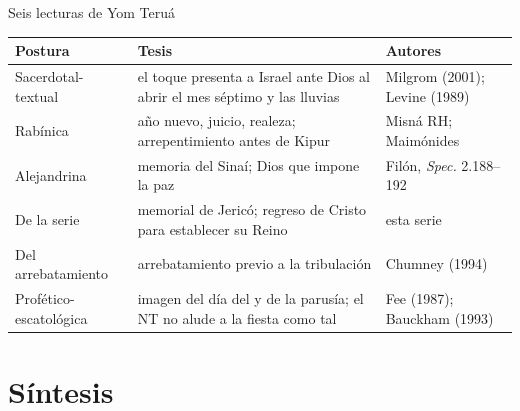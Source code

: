 \begin{frame}{Seis lecturas de Yom Teruá}
\renewcommand{\arraystretch}{1.1}\scriptsize
\begin{tabular}{@{}L{2.4cm}L{5.6cm}L{3.6cm}@{}}
\toprule
\textbf{Postura} & \textbf{Tesis} & \textbf{Autores} \\ \midrule
Sacerdotal-textual & el toque presenta a Israel ante Dios al abrir el mes séptimo y las lluvias & Milgrom (2001); Levine (1989) \\
Rabínica & año nuevo, juicio, realeza; arrepentimiento antes de Kipur & Misná RH; Maimónides \\
Alejandrina & memoria del Sinaí; Dios que impone la paz & Filón, \emph{Spec.} 2.188--192 \\
De la serie & memorial de Jericó; regreso de Cristo para establecer su Reino & esta serie \\
Del arrebatamiento & arrebatamiento previo a la tribulación & Chumney (1994) \\
Profético-escatológica & imagen del día del \SENOR{} y de la parusía; el NT no alude a la fiesta como tal & Fee (1987); Bauckham (1993) \\
\bottomrule
\end{tabular}\par\medskip
{}
\end{frame}

\section{Síntesis}

